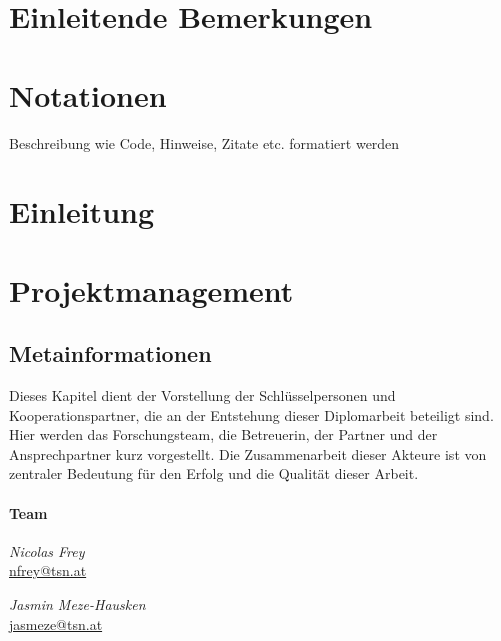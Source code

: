 \def \currentAuthor {Nicolas Frey} %

\chapter*{Einleitende Bemerkungen}



\chapter*{Notationen}
Beschreibung wie Code, Hinweise, Zitate etc. formatiert werden  



\chapter{Einleitung}



\chapter{Projektmanagement}



\section{Metainformationen}
Dieses Kapitel dient der Vorstellung der Schlüsselpersonen und Kooperationspartner, die an der Entstehung dieser Diplomarbeit beteiligt sind. Hier werden das Forschungsteam, die Betreuerin, der Partner und der Ansprechpartner kurz vorgestellt. Die Zusammenarbeit dieser Akteure ist von zentraler Bedeutung für den Erfolg und die Qualität dieser Arbeit.

\subsubsection*{Team}

\emph{Nicolas Frey} \\
\href{mailto:nfrey@tsn.at}{nfrey@tsn.at} 
\begin{figure}
\end{figure}

\emph{Jasmin Meze-Hausken} \\
\href{mailto:jasmeze@tsn.at}{jasmeze@tsn.at} 
\begin{figure}
\end{figure}


